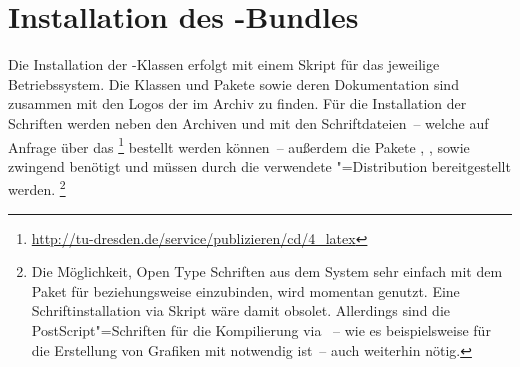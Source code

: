 \documentclass[%
  english,ngerman,%
  headings=optiontoheadandtoc,captions=tableheading,numbers=noenddot,%
  chapterpage,cdfoot,%
]{tudscrman}
\begin{document}
\section{Installation des \TUDScript-Bundles}
\label{sec:installation}
Die Installation der \TUDScript-Klassen erfolgt mit einem Skript für das 
jeweilige Betriebssystem. Die Klassen und Pakete sowie deren Dokumentation sind 
zusammen mit den Logos der \TnUD im Archiv  zu 
finden. Für die Installation der Schriften werden neben den Archiven 
 und  mit den 
Schriftdateien~-- welche auf Anfrage über das \CD%
\footnote{\url{http://tu-dresden.de/service/publizieren/cd/4_latex}} bestellt 
werden können~-- außerdem die Pakete , , 
 sowie  zwingend benötigt und müssen durch die 
verwendete "=Distribution bereitgestellt werden.%
\footnote{%
  Die Möglichkeit, Open Type Schriften aus dem System sehr einfach mit dem Paket
   für  beziehungsweise  
  einzubinden, wird momentan genutzt. Eine Schriftinstallation via Skript wäre 
  damit obsolet. Allerdings sind die PostScript"=Schriften für die Kompilierung 
  via ~-- wie es 
  beispielsweise für die Erstellung von Grafiken mit  
  notwendig ist~-- auch weiterhin nötig.
}
\end{document}
